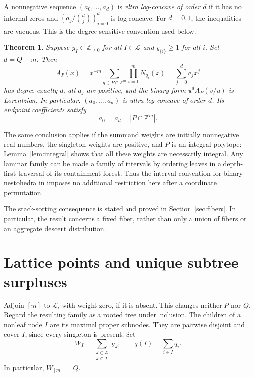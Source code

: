 \documentclass[11pt,letterpaper]{article}
\newtheorem{theorem}{Theorem}[section]
\theoremstyle{definition}
\theoremstyle{remark}
\newcommand{\NN}{\mathbb{Z}_{\geq 0}}
\newcommand{\ZZ}{\mathbb{Z}}
\newcommand{\cL}{\mathcal{L}}
\begin{document}
A nonnegative sequence $(a_0,\ldots,a_d)$ is \emph{ultra log-concave of order $d$} if it has no internal zeros and $(a_j/\binom dj)_{j=0}^d$ is log-concave. For $d=0,1$, the inequalities are vacuous. This is the degree-sensitive convention used below.

\begin{theorem}\label{thm:main}
Suppose $y_I\in\NN$ for all $I\in\cL$ and $y_{\{i\}}\geq1$ for all $i$. Set $d=Q-m$. Then
\begin{equation}\label{eq:A}
 A_P(x)=x^{-m}\sum_{q\in P\cap\ZZ^m}\prod_{i=1}^m N_{q_i}(x)
       =\sum_{j=0}^{d}a_jx^j
\end{equation}
has degree exactly $d$, all $a_j$ are positive, and the binary form $u^d A_P(v/u)$ is Lorentzian. In particular, $(a_0,\ldots,a_d)$ is ultra log-concave of order $d$. Its endpoint coefficients satisfy
\[
 a_0=a_d=|P\cap\ZZ^m|.
\]
\end{theorem}

The same conclusion applies if the summand weights are initially nonnegative real numbers, the singleton weights are positive, and $P$ is an integral polytope: Lemma~\ref{lem:integral} shows that all these weights are necessarily integral. Any laminar family can be made a family of intervals by ordering leaves in a depth-first traversal of its containment forest. Thus the interval convention for binary nestohedra in \cite[Section 2.6]{Defant2023} imposes no additional restriction here after a coordinate permutation.

The stack-sorting consequence is stated and proved in Section~\ref{sec:fibers}. In particular, the result concerns a fixed fiber, rather than only a union of fibers or an aggregate descent distribution.

\section{Lattice points and unique subtree surpluses}
Adjoin $[m]$ to $\cL$, with weight zero, if it is absent. This changes neither $P$ nor $Q$. Regard the resulting family as a rooted tree under inclusion. The children of a nonleaf node $I$ are its maximal proper subnodes. They are pairwise disjoint and cover $I$, since every singleton is present. Set
\[
 W_I=\sum_{\substack{J\in\cL\\J\subseteq I}}y_J,
 \qquad q(I)=\sum_{i\in I}q_i.
\]
In particular, $W_{[m]}=Q$.
\end{document}
